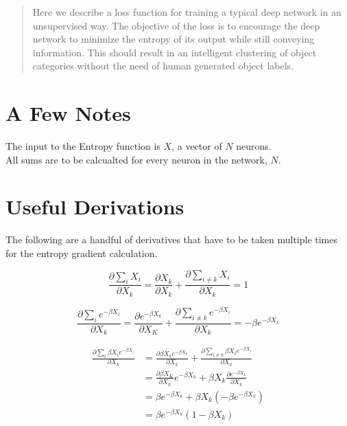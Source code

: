 \begin{abstract}
Here we describe a loss function for training a typical deep network in an unsupervised way. The objective of the loss is to encourage the deep network to minimize the entropy of its output while still conveying information. This should result in an intelligent clustering of object categories without the need of human generated object labels.
\end{abstract}

\section{A Few Notes} \label{notes}
\noindent The input to the Entropy function is $X$, a vector of $N$ neurons.\\
\noindent All sums are to be calcualted for every neuron in the network, $N$.

\section{Useful Derivations} \label{derivatives}
\noindent The following are a handful of derivatives that have to be taken multiple times for the entropy gradient calculation.

\begin{equation}
    \frac{\partial\sum_{i}X_i}{\partial X_{k}} = \frac{\partial X_{k}}{\partial X_{k}} + \frac{\partial \sum_{i \ne k} X_{i}}{\partial X_{k}} = 1
\label{dx}
\end{equation}

\begin{equation}
    \frac{\partial \sum_{i}e^{-\beta X_{i}}}{\partial X_{k}} = \frac{\partial e^{-\beta X_{k}}}{\partial X_{K}} + \frac{\partial \sum_{i \ne k} e^{-\beta X_{i}}}{\partial X_{k}} = -\beta e^{-\beta X_{k}}
\label{dex}
\end{equation}

\begin{equation}
\begin{aligned} 
    \frac{\partial \sum_{i}\beta X_{i} e^{-\beta X_{i}}}{\partial X_{k}} 
    &= \frac{\partial \beta X_{k} e^{-\beta X_{k}}}{\partial X_{k}} + \frac{\partial \sum_{i \ne k} \beta X_{i} e^{-\beta X_{i}}}{\partial X_{k}} \\
    &= \frac{\partial \beta X_{K}}{\partial X_{k}} e^{-\beta X_{k}} + \beta X_{k} \frac{\partial e^{-\beta X_{k}}}{\partial X_{k}}\\
    &= \beta e^{-\beta X_{k}} + \beta X_{k} (-\beta e^{-\beta X_{k}})\\
    &= \beta e^{-\beta X_{k}}(1 - \beta X_{k})
\label{dxex}
\end{aligned}
\end{equation}

